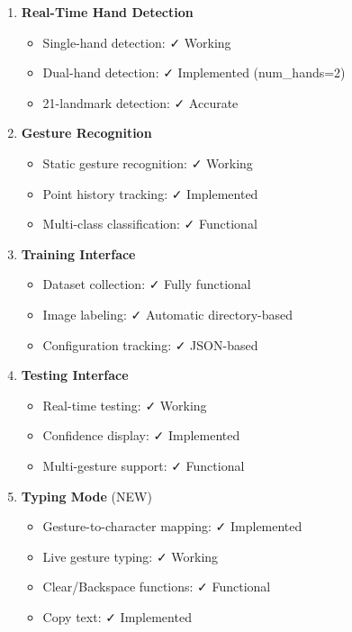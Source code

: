 \begin{enumerate}
    \item \textbf{Real-Time Hand Detection}
    \begin{itemize}
        \item Single-hand detection: ✓ Working
        \item Dual-hand detection: ✓ Implemented (num\_hands=2)
        \item 21-landmark detection: ✓ Accurate
    \end{itemize}
    
    \item \textbf{Gesture Recognition}
    \begin{itemize}
        \item Static gesture recognition: ✓ Working
        \item Point history tracking: ✓ Implemented
        \item Multi-class classification: ✓ Functional
    \end{itemize}
    
    \item \textbf{Training Interface}
    \begin{itemize}
        \item Dataset collection: ✓ Fully functional
        \item Image labeling: ✓ Automatic directory-based
        \item Configuration tracking: ✓ JSON-based
    \end{itemize}
    
    \item \textbf{Testing Interface}
    \begin{itemize}
        \item Real-time testing: ✓ Working
        \item Confidence display: ✓ Implemented
        \item Multi-gesture support: ✓ Functional
    \end{itemize}
    
    \item \textbf{Typing Mode} (NEW)
    \begin{itemize}
        \item Gesture-to-character mapping: ✓ Implemented
        \item Live gesture typing: ✓ Working
        \item Clear/Backspace functions: ✓ Functional
        \item Copy text: ✓ Implemented
    \end{itemize}
    

\end{enumerate}
